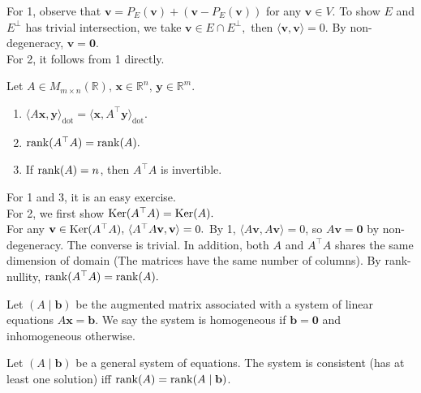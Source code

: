 \documentclass[12pt]{article}
\begin{document}
\begin{pfbox}
    For 1, observe that $\mathbf{v}=P_E(\mathbf{v})+(\mathbf{v}-P_E(\mathbf{v}))$ for any $\mathbf{v}\in V.$ To show $E$ and $E^\perp$ has trivial intersection, we take $\mathbf{v}\in E\cap E^\perp,$ then $\langle \mathbf{v},\mathbf{v}\rangle=0.$ By non-degeneracy, $\mathbf{v}=\mathbf{0}.$\\
    For 2, it follows from 1 directly.
\end{pfbox}

\begin{theorem} 
    Let $A\in M_{m\times n}(\mathbb{R}),\,\mathbf{x}\in\mathbb{R}^n,\,\mathbf{y}\in\mathbb{R}^m.$
    \begin{enumerate}
        \item $\langle A\mathbf{x}, \mathbf{y}\rangle_{\mathrm{dot}} = \langle \mathbf{x}, A^\top \mathbf{y}\rangle_{\mathrm{dot}}.$
        \item $\operatorname{rank}(A^\top A)=\operatorname{rank}(A).$
        \item If $\operatorname{rank}(A)=n$, then $A^\top A$ is invertible.
    \end{enumerate}
\end{theorem}

\begin{pfbox}
    For 1 and 3, it is an easy exercise.\\
    For 2, we first show $\operatorname{Ker}(A^\top A)=\operatorname{Ker}(A).$\\
    For any $\mathbf{v}\in\operatorname{Ker}(A^\top A),\,\langle A^\top A\mathbf{v}, \mathbf{v}\rangle=0.$ By 1, $\langle A\mathbf{v}, A\mathbf{v}\rangle=0$, so $A\mathbf{v}=\mathbf{0}$ by non-degeneracy. The converse is trivial.
    In addition, both $A$ and $A^\top A$ shares the same dimension of domain (The matrices have the same number of columns). By rank-nullity, $\operatorname{rank}(A^\top A)=\operatorname{rank}(A).$
\end{pfbox}

\begin{definition}
    Let $(A\mid \mathbf{b})$ be the augmented matrix associated with a system of linear equations $A\mathbf{x}=\mathbf{b}$.
    We say the system is homogeneous if $\mathbf{b}=\mathbf{0}$ and inhomogeneous otherwise.
\end{definition}

\begin{theorem}
    Let $(A\mid\mathbf{b})$ be a general system of equations.
    The system is consistent (has at least one solution) iff $\operatorname{rank}(A)=\operatorname{rank}(A\mid \mathbf{b})$.
\end{theorem}
\end{document}
